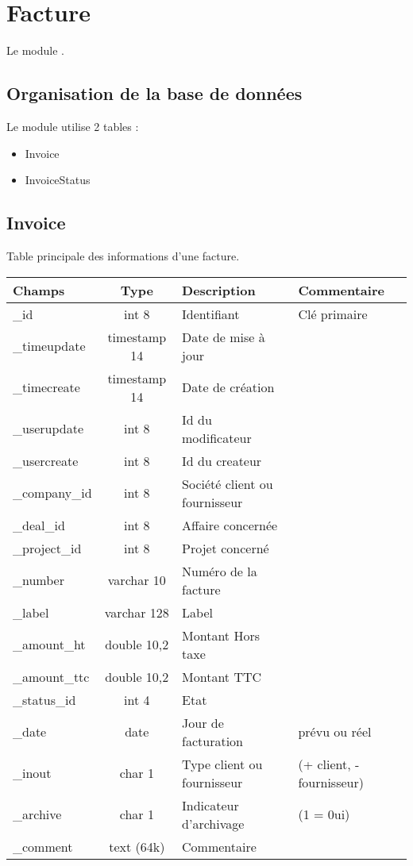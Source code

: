 

\clearpage
\section{Facture}

Le module \invoice \obm.

\subsection{Organisation de la base de données}

Le module \invoice utilise 2 tables :
\begin{itemize}
 \item Invoice
 \item InvoiceStatus
\end{itemize}

\subsection{Invoice}
Table principale des informations d'une facture.\\

\begin{tabular}{|p{3cm}|c|p{5.4cm}|p{2.6cm}|}
\hline
\textbf{Champs} & \textbf{Type} & \textbf{Description} & \textbf{Commentaire} \\
\hline
\_id & int 8 & Identifiant & Clé primaire \\
\hline
\_timeupdate & timestamp 14 & Date de mise à jour & \\
\hline
\_timecreate & timestamp 14 & Date de création & \\
\hline
\_userupdate & int 8 & Id du modificateur & \\
\hline
\_usercreate & int 8 & Id du createur & \\
\hline
\_company\_id & int 8 & Société client ou fournisseur & \\
\hline
\_deal\_id & int 8 & Affaire concernée & \\
\hline
\_project\_id & int 8 & Projet concerné & \\
\hline
\_number & varchar 10 & Numéro de la facture & \\
\hline
\_label & varchar 128 & Label & \\
\hline
\_amount\_ht & double 10,2 & Montant Hors taxe &\\
\hline
\_amount\_ttc & double 10,2 & Montant TTC &\\
\hline
\_status\_id & int 4 & Etat & \\
\hline
\_date & date & Jour de facturation & prévu ou réel \\
\hline
\_inout & char 1 & Type client ou fournisseur & (+ client, - fournisseur) \\
\hline
\_archive & char 1 & Indicateur d'archivage & (1 = 0ui)\\
\hline
\_comment & text (64k) & Commentaire &\\
\hline
\end{tabular}


